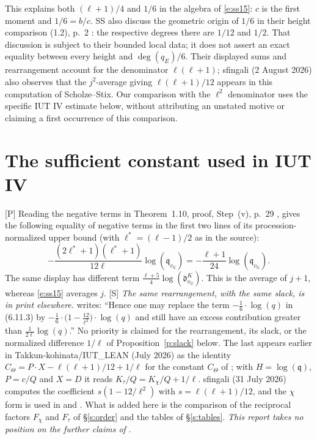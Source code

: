 \documentclass[11pt]{article}
\theoremstyle{remark}
\newcommand{\Pmark}{\textup{[P]}}
\begin{document}
This explains both $(\ell+1)/4$ and $1/6$ in the algebra of
\eqref{e:ss15}: $c$ is the first moment and $1/6=b/c$.
SS also discuss the geometric origin of $1/6$ in their height comparison
(1.2), p.~2 \cite[p.~2, (1.2)]{SS}: the respective degrees there are $1/12$ and $1/2$.
That discussion is subject to their bounded local data; it does not assert
an exact equality between every height and $\deg(q_E)/6$.
Their displayed sums and rearrangement account for the denominator
$\ell(\ell+1)$; sfingali \cite{Sf2} (2 August 2026) also observes that the
$j^2$-average giving $\ell(\ell+1)/12$ appears in this computation of Scholze--Stix.  Our comparison with the $\ell^2$ denominator uses the
specific IUT IV estimate below, without attributing an unstated motive
or claiming a first occurrence of this comparison.

\section{The sufficient constant used in IUT IV}\label{s:iv}

\Pmark{} Reading the negative terms in Theorem~1.10, proof, Step~(v), p.~29
\cite[Thm.~1.10, proof, Step~(v), p.~29]{IUT4}, gives the following equality of
negative terms in the first two lines of its procession-normalized upper
bound (with $\ell^*=(\ell-1)/2$ as in the source):
\[
 -\frac{(2\ell^*+1)(\ell^*+1)}{12\ell}\log(\mathfrak q_{v_{\mathbb Q}})
 =-\frac{\ell+1}{24}\log(\mathfrak q_{v_{\mathbb Q}}).
\]
The same display has different term
$\frac{\ell+5}{4}\log(\mathfrak d^K_{v_{\mathbb Q}})$.
This is the average of $j+1$, whereas \eqref{e:ss15} averages $j$.
\textup{[S]} \emph{The same rearrangement, with the same slack, is in print
elsewhere.}  \cite[p.~70]{JoshiIV} writes: ``Hence one may replace the term
$-\frac16\cdot\log(q)$ in (6.11.3) by $-\frac16\cdot\bigl(1-\frac{12}{\ell^2}\bigr)\cdot
\log(q)$ and still have an excess contribution greater than
$\frac1{2\ell}\log(q)$.''  No priority is claimed for the rearrangement, its slack,
or the normalized difference $1/\ell$ of Proposition~\ref{p:slack} below.  The last
appears earlier in Takkun-kohinata/IUT\_LEAN \cite{TK} (July 2026) as the identity
$C_\Theta=P\cdot X-\ell(\ell+1)/12+1/\ell$ for the constant $C_\Theta$ of
\cite[Thm.~1.10]{IUT4}; with $H=\log(\mathfrak q)$, $P=c/Q$ and $X=D$ it reads
$K_\tau/Q=K_\chi/Q+1/\ell$.  sfingali \cite{Sf1} (31 July 2026) computes the
coefficient $s(1-12/\ell^2)$ with $s=\ell(\ell+1)/12$, and the $\chi$ form is used in
\cite[\S\S7.12, 8.6]{DHPS} and \cite[Prop.~1.10]{Zhou}.  What is added here is the
comparison of the reciprocal factors $F_\chi$ and $F_\tau$ of \S\ref{s:order} and the
tables of \S\ref{s:tables}.  \emph{This report takes no
position on the further claims of} \cite{JoshiIV}.
\end{document}
